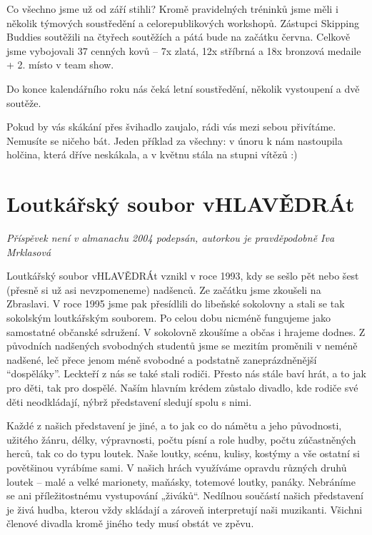 Co všechno jsme už od září stihli? Kromě pravidelných tréninků jsme měli
i několik týmových soustředění a celorepublikových workshopů. Zástupci
Skipping Buddies soutěžili na čtyřech soutěžích a pátá bude na začátku
června. Celkově jsme vybojovali 37 cenných kovů -- 7x zlatá, 12x
stříbrná a 18x bronzová medaile + 2. místo v team show.

Do konce kalendářního roku nás čeká letní soustředění, několik
vystoupení a dvě soutěže.

Pokud by vás skákání přes švihadlo zaujalo, rádi vás mezi sebou
přivítáme. Nemusíte se ničeho bát. Jeden příklad za všechny: v únoru k
nám nastoupila holčina, která dříve neskákala, a v květnu stála na
stupni vítězů :)

\section{Loutkářský soubor
vHLAVĚDRÁt}\label{loutkuxe1ux159skuxfd-soubor-vhlavux11bdruxe1t}

\emph{Příspěvek není v almanachu 2004 podepsán, autorkou je
pravděpodobně Iva Mrklasová}

Loutkářský soubor vHLAVĚDRÁt vznikl v roce 1993, kdy se sešlo pět nebo
šest (přesně si už asi nevzpomeneme) nadšenců. Ze začátku jsme zkoušeli
na Zbraslavi. V roce 1995 jsme pak přesídlili do libeňské sokolovny a
stali se tak sokolským loutkářským souborem. Po celou dobu nicméně
fungujeme jako samostatné občanské sdružení. V sokolovně zkoušíme a
občas i hrajeme dodnes. Z původních nadšených svobodných studentů jsme
se mezitím proměnili v neméně nadšené, leč přece jenom méně svobodné a
podstatně zaneprázdněnější ``dospěláky''. Leckteří z nás se také stali
rodiči. Přesto nás stále baví hrát, a to jak pro děti, tak pro dospělé.
Naším hlavním krédem zůstalo divadlo, kde rodiče své děti neodkládají,
nýbrž představení sledují spolu s nimi.

Každé z našich představení je jiné, a to jak co do námětu a jeho
původnosti, užitého žánru, délky, výpravnosti, počtu písní a role hudby,
počtu zúčastněných herců, tak co do typu loutek. Naše loutky, scénu,
kulisy, kostýmy a vše ostatní si povětšinou vyrábíme sami. V našich
hrách využíváme opravdu různých druhů loutek -- malé a velké marionety,
maňásky, totemové loutky, panáky. Nebráníme se ani příležitostnému
vystupování „živáků``. Nedílnou součástí našich představení je živá
hudba, kterou vždy skládají a zároveň interpretují naši muzikanti.
Všichni členové divadla kromě jiného tedy musí obstát ve zpěvu.

